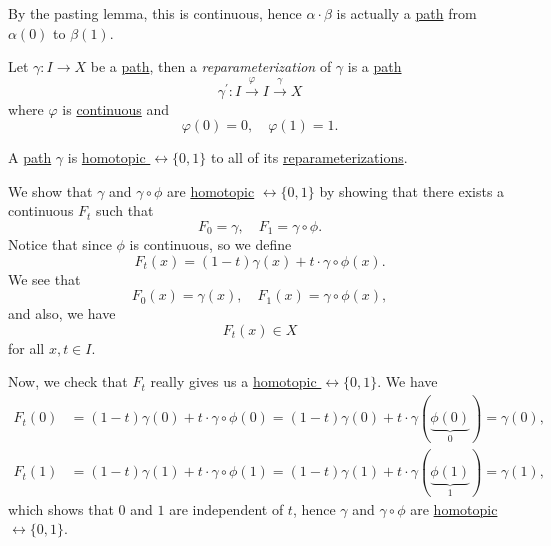 \begin{remark}
	By the pasting lemma, this is continuous, hence \(\alpha \cdot \beta \) is actually a \hyperref[def:path]{path} from \(\alpha (0)\) to \(\beta (1)\).
\end{remark}

\begin{definition}[Reparameterization]\label{def:reparameterization}
	Let \(\gamma\colon I\to X\) be a \hyperref[def:path]{path}, then a \emph{reparameterization} of \(\gamma\) is a \hyperref[def:path]{path}
	\[
		\gamma ^\prime \colon I\overset{\varphi }{\longrightarrow} I\overset{\gamma}{\longrightarrow} X
	\]
	where \(\varphi \) is \underline{continuous} and
	\[
		\varphi (0) = 0,\quad \varphi (1) = 1.
	\]
\end{definition}

\begin{exercise}
	A \hyperref[def:path]{path} \(\gamma\) is \hyperref[def:homotopy-relative]{homotopic \(\rel \{0, 1\}\)} to all of its
	\hyperref[def:reparameterization]{reparameterizations}.
\end{exercise}
\begin{answer}
	\par We show that \(\gamma\) and \(\gamma\circ \phi \) are \hyperref[def:homotopic]{homotopic} \(\rel \{0, 1\}\) by showing that
	there exists a continuous \(F_t\) such that
	\[
		F_0 = \gamma,\quad F_1 = \gamma\circ \phi.
	\]
	Notice that since \(\phi \) is continuous, so we define
	\[
		F_t(x) = (1 - t) \gamma(x) + t\cdot \gamma\circ \phi (x).
	\]
	We see that
	\[
		F_0(x) = \gamma(x),\quad F_1(x) = \gamma\circ \phi (x),
	\]
	and also, we have
	\[
		F_t(x)\in X
	\]
	for all \(x, t\in I\).

	\par Now, we check that \(F_t\) really gives us a \hyperref[def:homotopy-relative]{homotopic \(\rel \{0, 1\}\)}. We have
	\[
		\begin{split}
			F_t(0) & = (1 - t)\gamma(0) + t\cdot \gamma\circ \phi (0) = (1 - t)\gamma(0) + t\cdot \gamma(\underbrace{\phi (0)}_{0}) = \gamma(0), \\
			F_t(1) & = (1 - t)\gamma(1) + t\cdot \gamma\circ \phi (1) = (1 - t)\gamma(1) + t\cdot \gamma(\underbrace{\phi (1)}_{1}) = \gamma(1),
		\end{split}
	\]
	which shows that \(0\) and \(1\) are independent of \(t\), hence \(\gamma\) and \(\gamma\circ \phi \) are \hyperref[def:homotopy-relative]{homotopic \(\rel \{0, 1\}\)}.
\end{answer}

